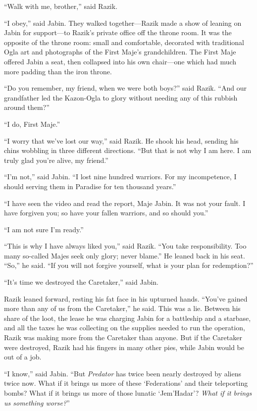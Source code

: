 \documentclass[twoside,letterpaper,12pt]{memoir}
\begin{document}
``Walk with me, brother,'' said Razik.

``I obey,'' said Jabin. They walked together---Razik made a show of leaning on Jabin for support---to Razik's private office off the throne room. It was the opposite of the throne room: small and comfortable, decorated with traditional Ogla art and photographs of the First Maje's grandchildren. The First Maje offered Jabin a seat, then collapsed into his own chair---one which had much more padding than the iron throne.

``Do you remember, my friend, when we were both boys?'' said Razik. ``And our grandfather led the Kazon-Ogla to glory without needing any of this rubbish around them?''

``I do, First Maje.''

``I worry that we've lost our way,'' said Razik. He shook his head, sending his chins wobbling in three different directions. ``But that is not why I am here. I am truly glad you're alive, my friend.''

``I'm not,'' said Jabin. ``I lost nine hundred warriors. For my incompetence, I should serving them in Paradise for ten thousand years.''

``I have seen the video and read the report, Maje Jabin. It was not your fault. I have forgiven you; so have your fallen warriors, and so should you.''

``I am not sure I'm ready.''

``This is why I have always liked you,'' said Razik. ``You take responsibility. Too many so-called Majes seek only glory; never blame.'' He leaned back in his seat. ``So,'' he said. ``If you will not forgive yourself, what is your plan for redemption?''

``It's time we destroyed the Caretaker,'' said Jabin.

Razik leaned forward, resting his fat face in his upturned hands. ``You've gained more than any of us from the Caretaker,'' he said. This was a lie. Between his share of the loot, the lease he was charging Jabin for a battleship and a starbase, and all the taxes he was collecting on the supplies needed to run the operation, Razik was making more from the Caretaker than anyone. But if the Caretaker were destroyed, Razik had his fingers in many other pies, while Jabin would be out of a job.

``I know,'' said Jabin. ``But \textit{Predator} has twice been nearly destroyed by aliens twice now. What if it brings us more of these `Federations' and their teleporting bombs? What if it brings us more of those lunatic `Jem'Hadar'? \textit{What if it brings us something worse?}''
\end{document}
